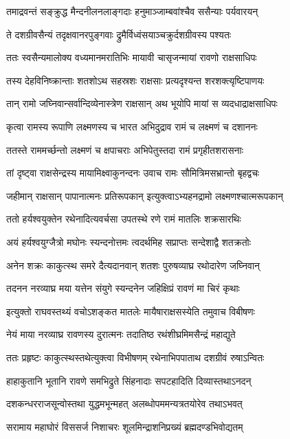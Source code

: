 \twolineshloka
{तमाद्रवन्तं सङ्क्रुद्ध मैन्दनीलनलाङ्गदाः}
{हनुमाञ्जाम्बवांश्चैव ससैन्याः पर्यवारयन्}


\twolineshloka
{ते दशग्रीवसैन्यं तदृक्षवानरपुङ्गवाः}
{द्रुमैर्विध्वंसयाञ्चक्रुर्दशग्रीवस्य पश्यतः}


\twolineshloka
{ततः स्वसैन्यमालोक्य वध्यमानमरातिभिः}
{मायावी चासृजन्मायां रावणो राक्षसाधिपः}


\twolineshloka
{तस्य देहविनिष्क्रान्ताः शतशोऽथ सहस्रशः}
{राक्षसाः प्रत्यदृश्यन्त शरशक्त्यृष्टिपाणयः}


\twolineshloka
{तान् रामो जघ्निवान्सर्वान्दिव्येनास्त्रेण राक्षसान्}
{अथ भूयोपि मायां स व्यदधाद्राक्षसाधिपः}


\twolineshloka
{कृत्वा रामस्य रूपाणि लक्ष्मणस्य च भारत}
{अभिदुद्राव रामं च लक्ष्मणं च दशाननः}


\twolineshloka
{ततस्ते राममर्च्छन्तो लक्ष्मणं च क्षपाचराः}
{अभिपेतुस्तदा रामं प्रगृहीतशरासनाः}


\twolineshloka
{तां दृष्ट्वा राक्षसेन्द्रस्य मायामिक्ष्वाकुनन्दनः}
{उवाच रामः सौमित्रिमसभ्रान्तो बृहद्वचः}


\twolineshloka
{जहीमान् राक्षसान् पापानात्मनः प्रतिरूपकान्}
{इत्युक्त्वाऽभ्यहनद्रामो लक्ष्मणश्चात्मरूपकान्}


\twolineshloka
{ततो हर्यश्वयुक्तेन रथेनादित्यवर्चसा}
{उपतस्थे रणे रामं मातलिः शक्रसारथिः}



\twolineshloka
{अयं हर्यश्वयुग्जैत्रो मघोनः स्यन्दनोत्तमः}
{त्वदर्थमिह सप्राप्तः सन्देशाद्वै शतक्रतोः}


\twolineshloka
{अनेन शक्रः काकुत्स्थ समरे दैत्यदानवान्}
{शतशः पुरुषव्याघ्र रथोदारेण जघ्निवान्}


\twolineshloka
{तदनन नरव्याघ्र मया यत्तेन संयुगे}
{स्यन्दनेन जहिक्षिप्रं रावणं मा चिरं कृथाः}


\twolineshloka
{इत्युक्तो राघवस्तथ्यं वचोऽशङ्कत मातलेः}
{मायैषाराक्षसस्येति तमुवाच विबीषणः}


\twolineshloka
{नेयं माया नरव्याघ्र रावणस्य दुरात्मनः}
{तदातिष्ठ रथंशीघ्रमिमसैन्द्रं महाद्युते}


\twolineshloka
{ततः प्रहृष्टः काकुत्स्थस्तथेत्युक्त्वा विभीषणम्}
{रथेनाभिपपाताथ दशग्रीवं रुषाऽन्वितः}


\twolineshloka
{हाहाकुतानि भूतानि रावणे समभिद्रुते}
{सिंहनादाः सपटहादिति दिव्यास्तथाऽनदन्}


\twolineshloka
{दशकन्धरराजसून्वोस्तथा युद्धमभून्महत्}
{अलब्धोपममन्यत्रतयोरेव तथाऽभवत्}


\twolineshloka
{सरामाय महाघोरं विससर्ज निशाचरः}
{शूलमिन्द्राशनिप्रख्यं ब्रह्मदण्डभिवोद्यतम्}


